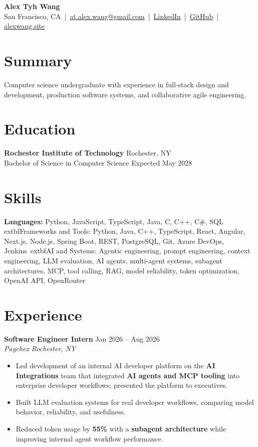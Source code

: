\documentclass[10pt,letterpaper]{article}
\newif\ifresumeFirstRole
\newcommand{\resumeRole}[4]{%
  \ifresumeFirstRole
    \global\resumeFirstRolefalse
  \else
    \vspace{0pt plus 1fill}%
  \fi
  \textbf{#1} \hfill #2\\
  \textit{#3} \hfill \textit{#4}
}
\begin{document}
\begin{center}
{\Large \textbf{Alex Tyh Wang}}\\
San Francisco, CA \,|\, \href{mailto:at.alex.wang@gmail.com}{at.alex.wang@gmail.com} \,|\, \href{https://www.linkedin.com/in/alex-tyh-wang/}{LinkedIn} \,|\, \href{https://github.com/alextyhwang}{GitHub} \,|\, \href{https://alexwang.site}{alexwang.site}
\end{center}

\section*{Summary}
Computer science undergraduate with experience in full-stack design and development, production software systems, and collaborative agile engineering.

\section*{Education}
\textbf{Rochester Institute of Technology} \hfill Rochester, NY\\
Bachelor of Science in Computer Science \hfill Expected May 2028

\section*{Skills}
\textbf{Languages:} Python, JavaScript, TypeScript, Java, C, C++, C\#, SQL\\
	extbf{Frameworks and Tools:} Python, Java, C++, TypeScript, React, Angular, Next.js, Node.js, Spring Boot, REST, PostgreSQL, Git, Azure DevOps, Jenkins\
	extbf{AI and Systems:} Agentic engineering, prompt engineering, context engineering, LLM evaluation, AI agents, multi-agent systems, subagent architectures, MCP, tool calling, RAG, model reliability, token optimization, OpenAI API, OpenRouter

\section*{Experience}
\resumeRole{Software Engineer Intern}{Jan 2026 -- Aug 2026}{Paychex}{Rochester, NY}
\begin{itemize}
  \item Led development of an internal AI developer platform on the \textbf{AI Integrations} team that integrated \textbf{AI agents and MCP tooling} into enterprise developer workflows; presented the platform to executives.
  \item Built LLM evaluation systems for real developer workflows, comparing model behavior, reliability, and usefulness.
  \item Reduced token usage by \textbf{55\%} with a \textbf{subagent architecture} while improving internal agent workflow performance.
\end{itemize}
\end{document}
